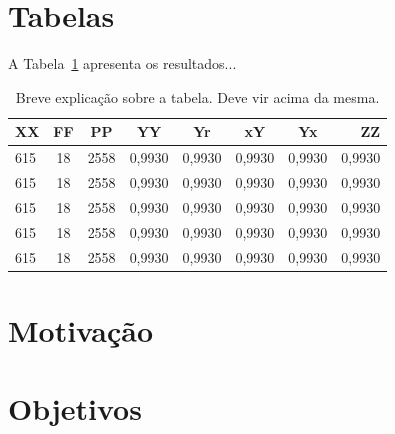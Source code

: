 \section*{Tabelas}\label{sec:tabelas}

A Tabela~\ref{tab:tabela} apresenta os resultados...

\begin{table}[htpb]
   \centering
   \caption{Breve explicação sobre a tabela. Deve vir acima da mesma.}\label{tab:tabela}
   \begin{tabular}{|l|c|c|c|c|c|c|r|}
        \hline
        \small{XX} & \small{FF} & \small{PP} & \small{YY} & \small{Yr} & \small{xY} & \small{Yx} & \small{ZZ} \\ \hline
               615 &    18      &     2558   &    0,9930  &    0,9930  &    0,9930  &    0,9930  &    0,9930  \\ \hline
               615 &    18      &     2558   &    0,9930  &    0,9930  &    0,9930  &    0,9930  &    0,9930  \\ \hline
               615 &    18      &     2558   &    0,9930  &    0,9930  &    0,9930  &    0,9930  &    0,9930  \\ \hline
               615 &    18      &     2558   &    0,9930  &    0,9930  &    0,9930  &    0,9930  &    0,9930  \\ \hline
               615 &    18      &     2558   &    0,9930  &    0,9930  &    0,9930  &    0,9930  &    0,9930  \\ \hline
   \end{tabular}
\end{table}

\section*{Motivação}\label{sec:motivacao}

\lipsum[35]

\section*{Objetivos}\label{sec:objetivos}

\lipsum[36]
